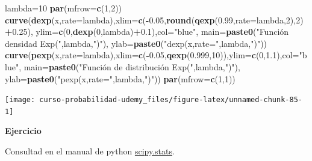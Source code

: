 \documentclass[]{book}
\newenvironment{Shaded}{\begin{snugshade}}{\end{snugshade}}
\newcommand{\DataTypeTok}[1]{\textcolor[rgb]{0.13,0.29,0.53}{#1}}
\newcommand{\DecValTok}[1]{\textcolor[rgb]{0.00,0.00,0.81}{#1}}
\newcommand{\FloatTok}[1]{\textcolor[rgb]{0.00,0.00,0.81}{#1}}
\newcommand{\KeywordTok}[1]{\textcolor[rgb]{0.13,0.29,0.53}{\textbf{#1}}}
\newcommand{\NormalTok}[1]{#1}
\newcommand{\OperatorTok}[1]{\textcolor[rgb]{0.81,0.36,0.00}{\textbf{#1}}}
\newcommand{\StringTok}[1]{\textcolor[rgb]{0.31,0.60,0.02}{#1}}
\begin{document}
\begin{Shaded}
\begin{Highlighting}[]
\NormalTok{lambda=}\DecValTok{10}
\KeywordTok{par}\NormalTok{(}\DataTypeTok{mfrow=}\KeywordTok{c}\NormalTok{(}\DecValTok{1}\NormalTok{,}\DecValTok{2}\NormalTok{))}
\KeywordTok{curve}\NormalTok{(}\KeywordTok{dexp}\NormalTok{(x,}\DataTypeTok{rate=}\NormalTok{lambda),}\DataTypeTok{xlim=}\KeywordTok{c}\NormalTok{(}\OperatorTok{-}\FloatTok{0.05}\NormalTok{,}\KeywordTok{round}\NormalTok{(}\KeywordTok{qexp}\NormalTok{(}\FloatTok{0.99}\NormalTok{,}\DataTypeTok{rate=}\NormalTok{lambda,}\DecValTok{2}\NormalTok{),}\DecValTok{2}\NormalTok{)}\OperatorTok{+}\FloatTok{0.25}\NormalTok{),}
      \DataTypeTok{ylim=}\KeywordTok{c}\NormalTok{(}\DecValTok{0}\NormalTok{,}\KeywordTok{dexp}\NormalTok{(}\DecValTok{0}\NormalTok{,lambda)}\OperatorTok{+}\FloatTok{0.1}\NormalTok{),}\DataTypeTok{col=}\StringTok{"blue"}\NormalTok{,}
      \DataTypeTok{main=}\KeywordTok{paste0}\NormalTok{(}\StringTok{"Función densidad Exp("}\NormalTok{,lambda,}\StringTok{")"}\NormalTok{),}
      \DataTypeTok{ylab=}\KeywordTok{paste0}\NormalTok{(}\StringTok{"dexp(x,rate="}\NormalTok{,lambda,}\StringTok{")"}\NormalTok{))}
\KeywordTok{curve}\NormalTok{(}\KeywordTok{pexp}\NormalTok{(x,}\DataTypeTok{rate=}\NormalTok{lambda),}\DataTypeTok{xlim=}\KeywordTok{c}\NormalTok{(}\OperatorTok{-}\FloatTok{0.05}\NormalTok{,}\KeywordTok{qexp}\NormalTok{(}\FloatTok{0.999}\NormalTok{,}\DecValTok{10}\NormalTok{)),}\DataTypeTok{ylim=}\KeywordTok{c}\NormalTok{(}\DecValTok{0}\NormalTok{,}\FloatTok{1.1}\NormalTok{),}\DataTypeTok{col=}\StringTok{"blue"}\NormalTok{,}
      \DataTypeTok{main=}\KeywordTok{paste0}\NormalTok{(}\StringTok{"Función de distribución Exp("}\NormalTok{,lambda,}\StringTok{")"}\NormalTok{),}
      \DataTypeTok{ylab=}\KeywordTok{paste0}\NormalTok{(}\StringTok{"pexp(x,rate="}\NormalTok{,lambda,}\StringTok{")"}\NormalTok{))}
\KeywordTok{par}\NormalTok{(}\DataTypeTok{mfrow=}\KeywordTok{c}\NormalTok{(}\DecValTok{1}\NormalTok{,}\DecValTok{1}\NormalTok{))}
\end{Highlighting}
\end{Shaded}

\begin{center}\texttt{[image: curso-probabilidad-udemy\_files/figure-latex/unnamed-chunk-85-1]} \end{center}

\textbf{Ejercicio}

Consultad en el manual de python \href{https://docs.scipy.org/doc/scipy/reference/generated/scipy.stats.expon.html}{scipy.stats}.
\end{document}
